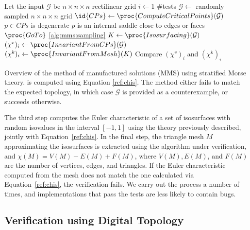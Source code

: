 \begin{algorithm}[t]
\begin{codebox}
\li \Comment Let the input $\mathcal{G}$ be $n \times n \times n$ rectilinear grid
\li \For $i \gets 1$ \To $\#$tests
\li     \Do $\mathcal{G} \gets$ randomly sampled $n \times n \times n$ grid \label{alg:mms:sampling}
\li         $\id{CPs} \gets \proc{ComputeCriticalPoints}(\mathcal{G})$
\li         \If $p \in CPs$ is degenerate 
\li		$p$ is an internal saddle close to edges or faces
\li         	\Then $\proc{GoTo}$ \ref{alg:mms:sampling} \label{alg:mms:goto-smt}
\li         \Else $K \gets \proc{Isosurfacing}(\mathcal{G})$
\li         	  $(\chi^v)_i \gets \proc{InvariantFromCPs}(\mathcal{G})$
\li         	  $(\chi^k)_i \gets \proc{InvariantFromMesh}(K)$
	    \End
\li Compare $(\chi^v)_i$ and $(\chi^k)_i$
      \End
\end{codebox}
\caption{Overview of the method of manufactured solutions (MMS) using
stratified Morse theory.  is computed using Equation
\ref{ref:chis}. The method either fails to match the expected topology, in
which case $\mathcal{G}$ is provided as a counterexample, or
succeeds otherwise.}
\label{alg:manufactured-solutions-smt}
\end{algorithm}

The third step computes the Euler characteristic of a set of
isosurfaces with random isovalues in the interval $[-1, 1]$ using the
theory previously described, jointly with Equation~\ref{ref:chis}.  In
the final step, the triangle mesh $M$ approximating the isosurfaces is
extracted using the algorithm under verification, and $\chi(M) = V(M)
- E(M) + F(M)$, where $V(M),E(M)$, and $F(M)$ are the number of
vertices, edges, and triangles. If the Euler characteristic computed
from the mesh does not match the one calculated via
Equation~\ref{ref:chis}, the verification fails. We carry out the
process a number of times, and implementations that pass the tests are
less likely to contain bugs.

\subsection{Verification using Digital Topology}
\label{subsec:ds-verify}

